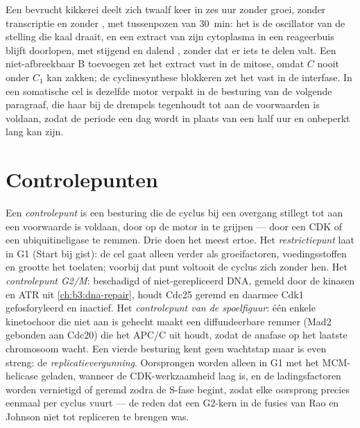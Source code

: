 \begin{example}\label{ex:b3:cell-cycle-apoptosis:frog}
Een bevrucht kikkerei deelt zich twaalf keer in zes uur zonder groei,
zonder transcriptie en zonder , met tussenpozen van
\qty{30}{min}: het is de oscillator van de stelling die kaal draait, en
een extract van zijn cytoplasma in een reageerbuis blijft doorlopen,
met stijgend en dalend , zonder dat er iets te delen valt. Een
niet-afbreekbaar  B toevoegen zet het extract vast in de mitose,
omdat $C$ nooit onder $C_{1}$ kan zakken; de cyclinesynthese blokkeren
zet het vast in de interfase. In een somatische cel is dezelfde motor
verpakt in de besturing van de volgende paragraaf, die haar bij de
drempels tegenhoudt tot aan de voorwaarden is voldaan, zodat de periode
een dag wordt in plaats van een half uur en onbeperkt lang kan zijn.
\end{example}

\section{Controlepunten}

\begin{definition}[Controlepunten]\label{def:b3:cell-cycle-apoptosis:checkpoints}
Een \emph{controlepunt} is een besturing die de cyclus bij een overgang
stillegt tot aan een voorwaarde is voldaan, door op de motor in te
grijpen --- door een CDK of een ubiquitineligase te remmen. Drie doen
het meest ertoe. Het \emph{restrictiepunt} laat in G1 (Start bij gist):
de cel gaat alleen verder als groeifactoren, voedingsstoffen en grootte
het toelaten; voorbij dat punt voltooit de cyclus zich zonder hen. Het
\emph{controlepunt G2/M}: beschadigd of niet-gerepliceerd DNA,
gemeld door de kinasen  en ATR uit \cref{ch:b3:dna-repair}, houdt
Cdc25 geremd en daarmee Cdk1 gefosforyleerd en inactief. Het
\emph{controlepunt van de spoelfiguur}: één enkele kinetochoor die niet
aan  is gehecht maakt een diffundeerbare remmer (Mad2
gebonden aan Cdc20) die het APC/C uit houdt, zodat de anafase op het
laatste chromosoom wacht. Een vierde besturing kent geen wachtstap maar
is even streng: de \emph{replicatievergunning}. Oorsprongen worden
alleen in G1 met het MCM-helicase geladen, wanneer de CDK-werkzaamheid
laag is, en de ladingsfactoren worden vernietigd of geremd zodra de
S-fase begint, zodat elke oorsprong precies eenmaal per cyclus vuurt
--- de reden dat een G2-kern in de fusies van Rao en Johnson niet tot
repliceren te brengen was.
\end{definition}

